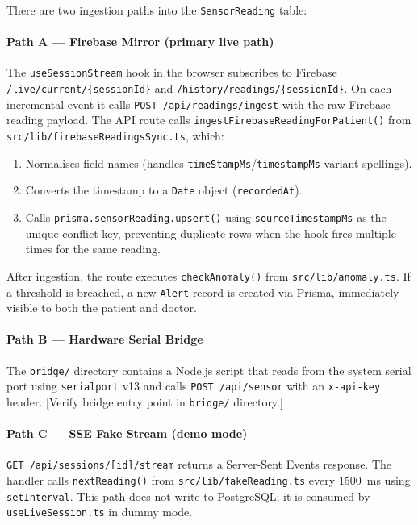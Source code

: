 \documentclass[12pt,a4paper]{report}
\begin{document}
There are two ingestion paths into the \texttt{SensorReading} table:

\paragraph{Path A --- Firebase Mirror (primary live path)}
The \texttt{useSessionStream} hook in the browser subscribes to Firebase
\texttt{/live/current/\{sessionId\}} and \texttt{/history/readings/\{sessionId\}}.
On each incremental event it calls \texttt{POST /api/readings/ingest}
with the raw Firebase reading payload. The API route calls
\texttt{ingestFirebaseReadingForPatient()} from
\texttt{src/lib/firebaseReadingsSync.ts}, which:

\begin{enumerate}[leftmargin=1.5em, itemsep=0.1em]
  \item Normalises field names (handles \texttt{timeStampMs}/\texttt{timestampMs}
        variant spellings).
  \item Converts the timestamp to a \texttt{Date} object (\texttt{recordedAt}).
  \item Calls \texttt{prisma.sensorReading.upsert()} using
        \texttt{sourceTimestampMs} as the unique conflict key,
        preventing duplicate rows when the hook fires multiple times
        for the same reading.
\end{enumerate}

After ingestion, the route executes \texttt{checkAnomaly()} from
\texttt{src/lib/anomaly.ts}. If a threshold is breached, a new
\texttt{Alert} record is created via Prisma, immediately visible to
both the patient and doctor.

\paragraph{Path B --- Hardware Serial Bridge}
The \texttt{bridge/} directory contains a Node.js script that reads from
the system serial port using \texttt{serialport} v13 and calls
\texttt{POST /api/sensor} with an \texttt{x-api-key} header.
[Verify bridge entry point in \texttt{bridge/} directory.]

\paragraph{Path C --- SSE Fake Stream (demo mode)}
\texttt{GET /api/sessions/[id]/stream} returns a Server-Sent Events
response. The handler calls \texttt{nextReading()} from
\texttt{src/lib/fakeReading.ts} every 1500~ms using
\texttt{setInterval}. This path does not write to PostgreSQL; it is
consumed by \texttt{useLiveSession.ts} in dummy mode.
\end{document}
